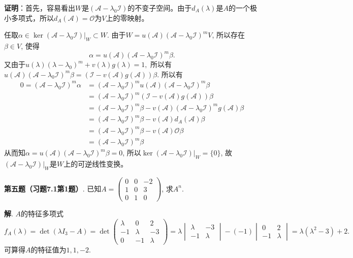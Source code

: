{\bf 证明}：首先，容易看出$W$是$(\mathscr{A} - \lambda_0\mathscr{I})$的不变子空间。由于$d_A(\lambda)$是$A$的一个极小多项式，所以$d_A(\mathscr{A}) = \mathscr{O}$为$V$上的零映射。

任取$\alpha \in \ker (\mathscr{A} - \lambda_0\mathscr{I})|_W \subset W$. 由于$W = u(\mathscr{A})(\mathscr{A} - \lambda_0\mathscr{I})^m V$, 所以存在$\beta \in V$, 使得
$$\alpha = u(\mathscr{A})(\mathscr{A} - \lambda_0\mathscr{I})^m \beta.$$
又由于$u(\lambda)(\lambda-\lambda_0)^m + v(\lambda)g(\lambda) = 1,$ 所以有$u(\mathscr{A})(\mathscr{A} - \lambda_0\mathscr{I})^m \beta = (\mathscr{I} - v(\mathscr{A})g(\mathscr{A})) \beta$. 所以有
\begin{align*}
0 = (\mathscr{A} - \lambda_0\mathscr{I})^m \alpha & = (\mathscr{A} - \lambda_0\mathscr{I})^m u(\mathscr{A})(\mathscr{A} - \lambda_0\mathscr{I})^m \beta \\
& = (\mathscr{A} - \lambda_0\mathscr{I})^m (\mathscr{I} - v(\mathscr{A})g(\mathscr{A})) \beta \\
& = (\mathscr{A} - \lambda_0\mathscr{I})^m \beta - v(\mathscr{A}) (\mathscr{A} - \lambda_0\mathscr{I})^m g(\mathscr{A}) \beta \\
& = (\mathscr{A} - \lambda_0\mathscr{I})^m \beta - v(\mathscr{A}) d_A(\mathscr{A}) \beta \\
& = (\mathscr{A} - \lambda_0\mathscr{I})^m \beta - v(\mathscr{A}) \mathscr{O} \beta \\
& = (\mathscr{A} - \lambda_0\mathscr{I})^m \beta
\end{align*}
从而知$\alpha = u(\mathscr{A})(\mathscr{A} - \lambda_0\mathscr{I})^m \beta = 0$, 所以$\ker (\mathscr{A} - \lambda_0\mathscr{I})|_W = \{0\}$, 故$(\mathscr{A} - \lambda_0\mathscr{I})|_W$是$W$上的可逆线性变换。


\newpageorvspace


{\bf 第五题（习题7.1第1题）}. 已知$A = \begin{pmatrix} 0 & 0 & -2 \\ 1 & 0 & 3 \\ 0 & 1 & 0 \end{pmatrix}$, 求$A^n$.

{\bf 解}. $A$的特征多项式
$$f_A(\lambda) = \det (\lambda I_3 - A) = \det \begin{pmatrix} \lambda & 0 & 2 \\ -1 & \lambda & -3 \\ 0 & -1 & \lambda \end{pmatrix} = \lambda \begin{vmatrix} \lambda & -3 \\ -1 & \lambda \end{vmatrix} - (-1) \begin{vmatrix} 0 & 2 \\ -1 & \lambda \end{vmatrix} = \lambda(\lambda^2-3) + 2.$$
可算得$A$的特征值为$1, 1, -2$.

